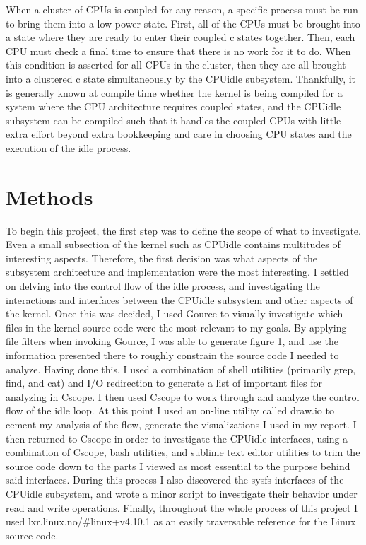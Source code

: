 \documentclass[10pt,preprint]{sigplanconf}
\begin{document}
When a cluster of CPUs is coupled for any reason, a specific process must be run to bring them into a low power state. First, all of the CPUs must be brought into a state where they are ready to enter their coupled c states together. Then, each CPU must check a final time to ensure that there is no work for it to do. When this condition is asserted for all CPUs in the cluster, then they are all brought into a clustered c state simultaneously by the CPUidle subsystem. Thankfully, it is generally known at compile time whether the kernel is being compiled for a system where the CPU architecture requires coupled states, and the CPUidle subsystem can be compiled such that it handles the coupled CPUs with little extra effort beyond extra bookkeeping and care in choosing CPU states and the execution of the idle process.

\section{Methods}

To begin this project, the first step was to define the scope of what to investigate. Even a small subsection of the kernel such as CPUidle contains multitudes of interesting aspects. Therefore, the first decision was what aspects of the subsystem architecture and implementation were the most interesting. I settled on delving into the control flow of the idle process, and investigating the interactions and interfaces between the CPUidle subsystem and other aspects of the kernel. Once this was decided, I used Gource to visually investigate which files in the kernel source code were the most relevant to my goals. By applying file filters when invoking Gource, I was able to generate figure 1, and use the information presented there to roughly constrain the source code I needed to analyze. Having done this, I used a combination of shell utilities (primarily grep, find, and cat) and I/O redirection to generate a list of important files for analyzing in Cscope. I then used Cscope to work through and analyze the control flow of the idle loop. At this point I used an on-line utility called draw.io to cement my analysis of the flow, generate the visualizations I used in my report. I then returned to Cscope in order to investigate the CPUidle interfaces, using a combination of Cscope, bash utilities, and sublime text editor utilities to trim the source code down to the parts I viewed as most essential to the purpose behind said interfaces. During this process I also discovered the sysfs interfaces of the CPUidle subsystem, and wrote a minor script to investigate their behavior under read and write operations. Finally, throughout the whole process of this project I used lxr.linux.no/\#linux+v4.10.1 as an easily traversable reference for the Linux source code.
\end{document}

